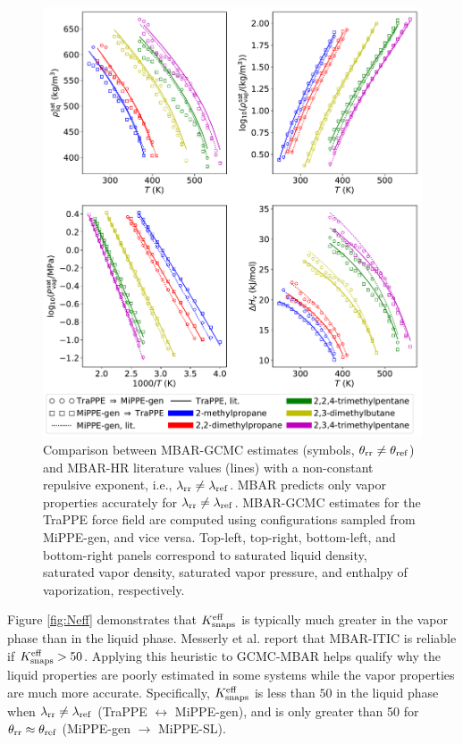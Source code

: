 \documentclass[journal=jced,manuscript=article]{achemso}
\begin{document}
	\begin{figure}[htb!]
		\centering
		\includegraphics[width=6.4in]{refFF_to_rrFF_lam_12to16.pdf}
		\caption{Comparison between MBAR-GCMC estimates (symbols, $\theta_{\rm rr} \neq \theta_{\rm ref}$) and MBAR-HR literature values (lines) with a non-constant repulsive exponent, i.e., $\lambda_{\rm rr} \neq \lambda_{\rm ref}$. MBAR predicts only vapor properties accurately for $\lambda_{\rm rr} \neq \lambda_{\rm ref}$. MBAR-GCMC estimates for the TraPPE force field are computed using configurations sampled from MiPPE-gen, and vice versa. Top-left, top-right, bottom-left, and bottom-right panels correspond to saturated liquid density, saturated vapor density, saturated vapor pressure, and enthalpy of vaporization, respectively.}
		\label{fig:refFF_to_rrFF_lam12to16}
	\end{figure}

Figure \ref{fig:Neff} demonstrates that $K_{\rm snaps}^{\rm eff}$ is typically much greater in the vapor phase than in the liquid phase. Messerly et al. report that MBAR-ITIC is reliable if $K_{\rm snaps}^{\rm eff} > 50$. Applying this heuristic to GCMC-MBAR helps qualify why the liquid properties are poorly estimated in some systems while the vapor properties are much more accurate. Specifically, $K_{\rm snaps}^{\rm eff}$ is less than $50$ in the liquid phase when $\lambda_{\rm rr} \neq \lambda_{\rm ref}$ (TraPPE $\leftrightarrow$ MiPPE-gen), and is only greater than 50 for $\theta_{\rm rr} \approx \theta_{\rm ref}$ (MiPPE-gen $\rightarrow$ MiPPE-SL).
\end{document}
